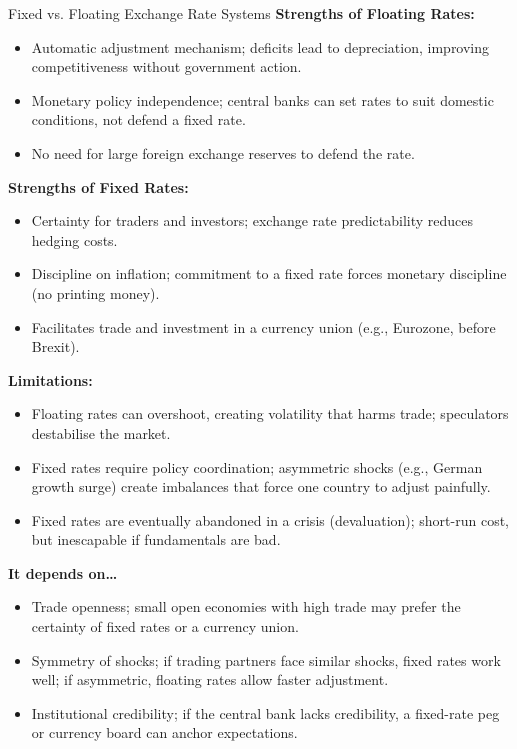 \documentclass[11pt, a4paper, twoside]{book}
\begin{document}
\begin{evaluation}{Fixed vs. Floating Exchange Rate Systems}
\textbf{Strengths of Floating Rates:}
\begin{itemize}[leftmargin=*, nosep]
\item Automatic adjustment mechanism; deficits lead to depreciation, improving competitiveness without government action.
\item Monetary policy independence; central banks can set rates to suit domestic conditions, not defend a fixed rate.
\item No need for large foreign exchange reserves to defend the rate.
\end{itemize}
\textbf{Strengths of Fixed Rates:}
\begin{itemize}[leftmargin=*, nosep]
\item Certainty for traders and investors; exchange rate predictability reduces hedging costs.
\item Discipline on inflation; commitment to a fixed rate forces monetary discipline (no printing money).
\item Facilitates trade and investment in a currency union (e.g., Eurozone, before Brexit).
\end{itemize}
\textbf{Limitations:}
\begin{itemize}[leftmargin=*, nosep]
\item Floating rates can overshoot, creating volatility that harms trade; speculators destabilise the market.
\item Fixed rates require policy coordination; asymmetric shocks (e.g., German growth surge) create imbalances that force one country to adjust painfully.
\item Fixed rates are eventually abandoned in a crisis (devaluation); short-run cost, but inescapable if fundamentals are bad.
\end{itemize}
\textbf{It depends on\ldots}
\begin{itemize}[leftmargin=*, nosep]
\item Trade openness; small open economies with high trade may prefer the certainty of fixed rates or a currency union.
\item Symmetry of shocks; if trading partners face similar shocks, fixed rates work well; if asymmetric, floating rates allow faster adjustment.
\item Institutional credibility; if the central bank lacks credibility, a fixed-rate peg or currency board can anchor expectations.
\end{itemize}
\end{evaluation}
\end{document}
